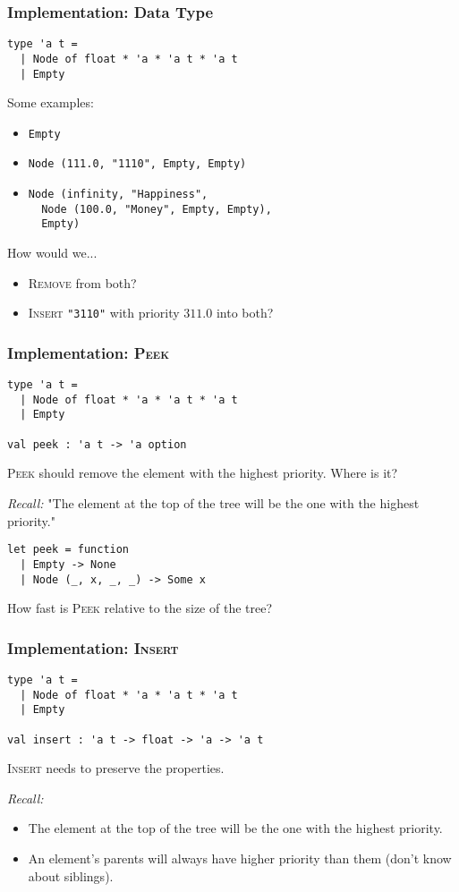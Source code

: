 \documentclass{beamer}
\begin{document}
\begin{frame}[fragile]
\frametitle{Implementation: Data Type}
\begin{lstlisting}
type 'a t =
  | Node of float * 'a * 'a t * 'a t
  | Empty
\end{lstlisting}
\pause

Some examples: \pause
\begin{itemize}
\item \verb|Empty| \pause
\item \verb|Node (111.0, "1110", Empty, Empty)| \pause
\item \verb|Node (infinity, "Happiness",| \\
      \verb|  Node (100.0, "Money", Empty, Empty),| \\
      \verb|  Empty)|
\end{itemize}
\pause

How would we... \pause
\begin{itemize}
\item \textsc{Remove} from both? \pause
\item \textsc{Insert} \verb|"3110"| with priority $311.0$ into both?
\end{itemize}
\end{frame}

\begin{frame}[fragile]
\frametitle{Implementation: \textsc{Peek}}
\begin{lstlisting}
type 'a t =
  | Node of float * 'a * 'a t * 'a t
  | Empty

val peek : 'a t -> 'a option
\end{lstlisting}
\pause
\textsc{Peek} should remove the element with the highest priority.
Where is it?
\pause

\textit{Recall:} 
"The element at the top of the tree will be the one with the highest priority."
\pause

\begin{lstlisting}
let peek = function
  | Empty -> None
  | Node (_, x, _, _) -> Some x
\end{lstlisting}

\pause
How fast is \textsc{Peek} relative to the size of the tree?
\end{frame}

\begin{frame}[fragile]
\frametitle{Implementation: \textsc{Insert}}
\begin{lstlisting}
type 'a t =
  | Node of float * 'a * 'a t * 'a t
  | Empty

val insert : 'a t -> float -> 'a -> 'a t
\end{lstlisting}
\pause

\textsc{Insert} needs to preserve the properties.

\textit{Recall:} 
\begin{itemize}
\item The element at the top of the tree will be the one with the highest priority.
\item An element's parents will always have higher priority than them (don't know about siblings).
\end{itemize}
\end{frame}
\end{document}
